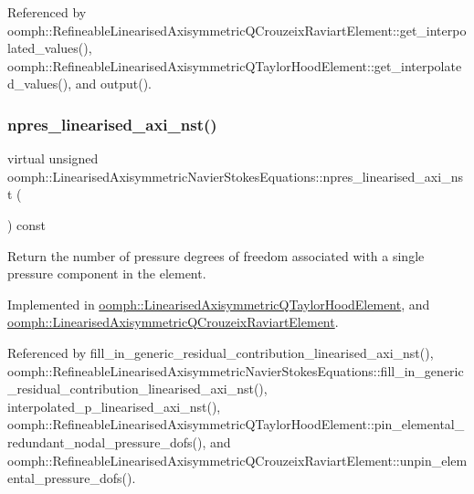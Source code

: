 Referenced by oomph\+::\+Refineable\+Linearised\+Axisymmetric\+Q\+Crouzeix\+Raviart\+Element\+::get\+\_\+interpolated\+\_\+values(), oomph\+::\+Refineable\+Linearised\+Axisymmetric\+Q\+Taylor\+Hood\+Element\+::get\+\_\+interpolated\+\_\+values(), and output().

\mbox{\label{classoomph_1_1LinearisedAxisymmetricNavierStokesEquations_aad6f1582b4516aae4fe0ce3c9e2d16c2}} 
\subsubsection{\texorpdfstring{npres\+\_\+linearised\+\_\+axi\+\_\+nst()}{npres\_linearised\_axi\_nst()}}
{\footnotesize\ttfamily virtual unsigned oomph\+::\+Linearised\+Axisymmetric\+Navier\+Stokes\+Equations\+::npres\+\_\+linearised\+\_\+axi\+\_\+nst (\begin{DoxyParamCaption}{ }\end{DoxyParamCaption}) const\hspace{0.3cm}{\ttfamily [pure virtual]}}



Return the number of pressure degrees of freedom associated with a single pressure component in the element. 



Implemented in \hyperlink{classoomph_1_1LinearisedAxisymmetricQTaylorHoodElement_a90f9c61947bb1abe64e29f9bf1c204b6}{oomph\+::\+Linearised\+Axisymmetric\+Q\+Taylor\+Hood\+Element}, and \hyperlink{classoomph_1_1LinearisedAxisymmetricQCrouzeixRaviartElement_abeb1140cee07405cbaa6b3038e1ec2de}{oomph\+::\+Linearised\+Axisymmetric\+Q\+Crouzeix\+Raviart\+Element}.



Referenced by fill\+\_\+in\+\_\+generic\+\_\+residual\+\_\+contribution\+\_\+linearised\+\_\+axi\+\_\+nst(), oomph\+::\+Refineable\+Linearised\+Axisymmetric\+Navier\+Stokes\+Equations\+::fill\+\_\+in\+\_\+generic\+\_\+residual\+\_\+contribution\+\_\+linearised\+\_\+axi\+\_\+nst(), interpolated\+\_\+p\+\_\+linearised\+\_\+axi\+\_\+nst(), oomph\+::\+Refineable\+Linearised\+Axisymmetric\+Q\+Taylor\+Hood\+Element\+::pin\+\_\+elemental\+\_\+redundant\+\_\+nodal\+\_\+pressure\+\_\+dofs(), and oomph\+::\+Refineable\+Linearised\+Axisymmetric\+Q\+Crouzeix\+Raviart\+Element\+::unpin\+\_\+elemental\+\_\+pressure\+\_\+dofs().

